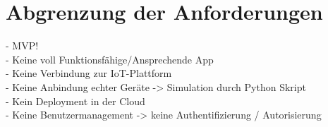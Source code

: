 \section{Abgrenzung der Anforderungen}\label{sec:Abgrenzung der Anforderungen}
- MVP!\\
- Keine voll Funktionsfähige/Ansprechende App\\
- Keine Verbindung zur IoT-Plattform\\
- Keine Anbindung echter Geräte -> Simulation durch Python Skript\\
- Kein Deployment in der Cloud\\
- Keine Benutzermanagement -> keine Authentifizierung / Autorisierung\\

